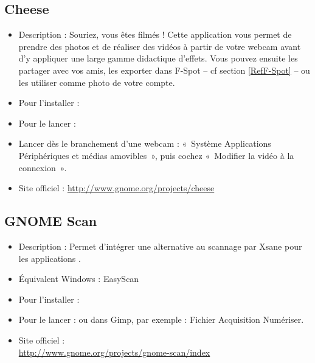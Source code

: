 \subsection{Cheese}
\begin{itemize}
\begingroup
{}
\item Description : Souriez, vous êtes filmés ! Cette application vous permet de prendre des photos et de réaliser des vidéos à partir de votre webcam avant d'y appliquer une large gamme didactique d'effets. Vous pouvez ensuite les partager avec vos amis, les exporter dans F-Spot -- cf section \ref{RefF-Spot} -- ou les utiliser comme photo de votre compte.{\par}
\item Pour l'installer : 
\item Pour le lancer : 
\item Lancer dès le branchement d'une webcam : «~Système \FlecheDroite Applications \FlecheDroite  Périphériques et médias amovibles~», puis cochez «~Modifier la vidéo à la connexion~».{\par}
\item Site officiel : \url{http://www.gnome.org/projects/cheese}{\par}
\endgroup
\end{itemize}
\subsection{GNOME Scan}
\begin{itemize}
\begingroup
{}
\item Description : Permet d'intégrer une alternative au scannage par Xsane pour les applications .{\par}
\item Équivalent Windows : EasyScan{\par}
\item Pour l'installer : 
\item Pour le lancer :  ou dans Gimp, par exemple : Fichier \FlecheDroite Acquisition \FlecheDroite Numériser.{\par}
\item Site officiel :\\\url{http://www.gnome.org/projects/gnome-scan/index}{\par}
\endgroup
\end{itemize}
